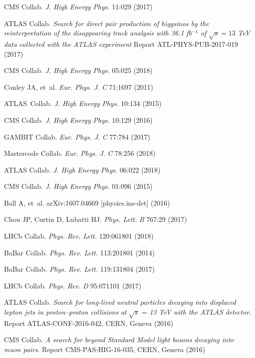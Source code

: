 \documentclass{ar-1col}
\begin{document}
\begin{thebibliography}{175}
{CMS Collab}. \textit{J. High Energy Phys.} 11:029 (2017)

{ATLAS Collab}. \textit{Search for direct pair production of higgsinos by the reinterpretation of the disappearing track analysis with 36.1 fb$^{-1}$ of $\sqrt{s}=13$ TeV data collected with the ATLAS experiment} Report ATL-PHYS-PUB-2017-019 (2017)
               
{CMS Collab}. \textit{J. High Energy Phys.} 05:025 (2018)

Conley JA, et~al. \textit{Eur. Phys. J.} \textit{C} 71:1697 (2011)

{ATLAS~Collab.} \textit{J. High Energy Phys.} 10:134 (2015)

{CMS Collab}. \textit{J. High Energy Phys.} 10:129 (2016)

GAMBIT Collab. \textit{Eur. Phys. J.} \textit{C} 77:784 (2017)

Mastercode Collab. \textit{Eur. Phys. J.} \textit{C} 78:256 (2018)

{ATLAS Collab}. \textit{J. High Energy Phys.} 06:022 (2018)

{CMS Collab}. \textit{J. High Energy Phys.} 01:096 (2015)

Ball A, et~al. arXiv:1607.04669 [physics.ins-det] (2016)

Chou JP, Curtin D, Lubatti HJ. \textit{Phys. Lett.} \textit{B} 767:29 (2017)

{LHCb Collab}.  \textit{Phys. Rev. Lett.} 120:061801 (2018)


BaBar Collab. \textit{Phys. Rev. Lett.} 113:201801 (2014)

BaBar Collab. \textit{Phys. Rev. Lett.} 119:131804 (2017)

{LHCb Collab}. \textit{Phys. Rev.} \textit{D} 95:071101 (2017)

ATLAS Collab. \textit{Search for long-lived neutral particles decaying into displaced lepton jets in proton--proton collisions at} $\sqrt{s}$ = \textit{13 TeV with the ATLAS detector}. Report ATLAS-CONF-2016-042, CERN, Geneva (2016)

CMS Collab. \textit{A search for beyond Standard Model light bosons decaying into muon pairs}.
Report CMS-PAS-HIG-16-035, CERN, Geneva (2016)


\end{thebibliography}
\end{document}
